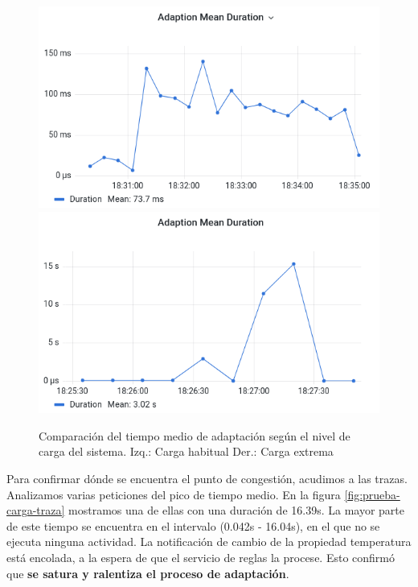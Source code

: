 \begin{figure}[h]
  \hspace{-1.2cm}
  \includegraphics[scale=0.42]{cap_despliegue/images/pruebas-carga-baseline}
  \includegraphics[scale=0.42]{cap_despliegue/images/pruebas-carga-extremo}
  \caption{Comparación del tiempo medio de adaptación según el nivel de carga del sistema. Izq.: Carga habitual Der.: Carga extrema}
  \label{fig:pruebas-carga}
\end{figure}

Para confirmar dónde se encuentra el punto de congestión, acudimos a las trazas. Analizamos varias peticiones del pico de tiempo medio. En la figura \ref{fig:prueba-carga-traza} mostramos una de ellas con una duración de 16.39s. La mayor parte de este tiempo se encuentra en el intervalo (0.042s - 16.04s), en el que no se ejecuta ninguna actividad. La notificación de cambio de la propiedad temperatura está encolada, a la espera de que el servicio de reglas la procese. Esto confirmó que \textbf{se satura y ralentiza el proceso de adaptación}.

